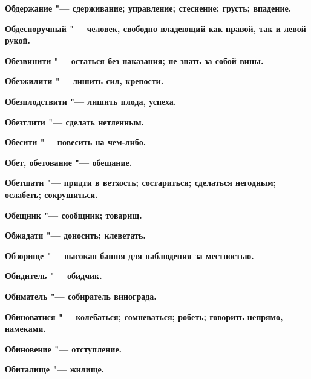 \begin{multicols}{2}
\bfseries Обдержание\normalfont{} "--- сдерживание; управление; стеснение; грусть; впадение. 




\bfseries Обдесноручный\normalfont{} "--- человек, свободно владеющий как правой, так и левой рукой. 




\bfseries Обезвинити\normalfont{} "--- остаться без наказания; не знать за собой вины. 




\bfseries Обезжилити\normalfont{} "--- лишить сил, крепости. 




\bfseries Обезплодствити\normalfont{} "--- лишить плода, успеха. 




\bfseries Обезтлити\normalfont{} "--- сделать нетленным. 




\bfseries Обесити\normalfont{} "--- повесить на чем-либо. 




\bfseries Обет, обетование\normalfont{} "--- обещание. 




\bfseries Обетшати\normalfont{} "--- придти в ветхость; состариться; сделаться негодным; ослабеть; сокрушиться. 




\bfseries Обещник\normalfont{} "--- сообщник; товарищ. 




\bfseries Обжадати\normalfont{} "--- доносить; клеветать. 




\bfseries Обзорище\normalfont{} "--- высокая башня для наблюдения за местностью. 




\bfseries Обидитель\normalfont{} "--- обидчик. 




\bfseries Обиматель\normalfont{} "--- собиратель винограда. 




\bfseries Обиноватися\normalfont{} "--- колебаться; сомневаться; робеть; говорить непрямо, намеками. 




\bfseries Обиновение\normalfont{} "--- отступление. 




\bfseries Обиталище\normalfont{} "--- жилище. 





\end{multicols}
